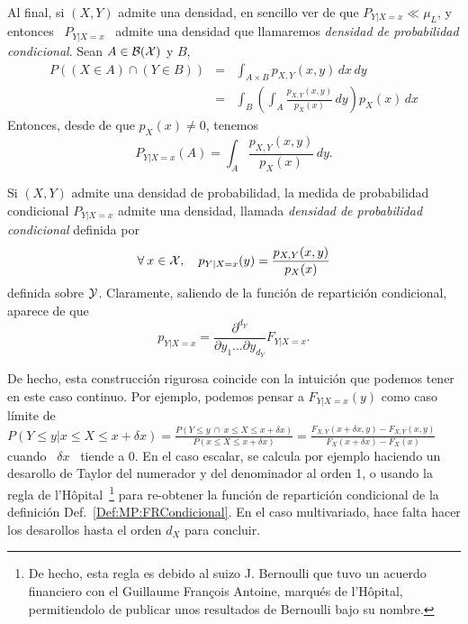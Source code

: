 Al final, si $(X,Y)$ admite una  densidad, en sencillo ver de que $P_{Y|X=x} \ll
\mu_L$,  y entonces  \ $P_{Y|X=x}$  \ admite  una densidad  que  llamaremos {\it
  densidad de probabilidad condicional}. Sean $A \in \mathcal{B}(\mathcal{X})$ y $B$,
%
\begin{eqnarray*}
P\left( (X \in A) \cap (Y \in B) \right) & = & \int_{A \times B} p_{X,Y}(x,y) \, dx \, dy\\[2mm]
%
& = & \int_B \left( \int_A \frac{p_{X,Y}(x,y)}{p_X(x)} \, dy \right) p_X(x) \, dx
\end{eqnarray*}
%
Entonces, desde de que $p_X(x) \ne 0$, tenemos
%
\[
P_{Y|X=x}(A) = \int_A \frac{p_{X,Y}(x,y)}{p_X(x)} \, dy.
\]
%
\begin{teorema}
\label{Def:MP:DensidadCondicional}
%
  Si  $(X,Y)$ admite  una densidad  de probabilidad,  la medida  de probabilidad
  condicional  $P_{Y|X=x}$  admite  una   densidad,  llamada  {\it  densidad  de
    probabilidad condicional} definida por
  \[
  \forall \: x \in \mathcal{X}, \quad p_{Y|X=x}(y) = \frac{p_{X,Y}(x,y)}{p_X(x)}
  \]
  definida  sobre $\mathcal{Y}$. Claramente,  saliendo de  la funci\'on  de repartici\'on
  condicional, aparece de que
  \[
  p_{Y|X=x} = \frac{\partial^{d_Y}}{\partial y_1 \ldots \partial y_{d_Y}} F_{Y|X=x}.
  \]
\end{teorema}

De hecho, esta  construcci\'on rigurosa coincide con la  intuici\'on que podemos
tener en este  caso continuo. Por ejemplo, podemos  pensar a $F_{Y|X=x}(y)$ como
caso l\'imite de $P(\left. Y \le y \right|  x \le X \le x+\delta x) = \frac{P( Y
  \le  y \:  \cap \:  x \le  X \le  x+\delta x)}{P(x  \le X  \le x+\delta  x)} =
\frac{F_{X,Y}(x+\delta  x ,  y) -  F_{X,Y}(x  , y)}{F_X(x+\delta  x) -  F_X(x)}$
cuando \ $\delta  x$ \ tiende a 0.   En el caso escalar, se  calcula por ejemplo
haciendo un  desarollo de Taylor del numerador  y del denominador al  orden 1, o
usando la regla de l'H\^opital~\footnote{De hecho, esta regla es debido al suizo
  J.  Bernoulli  que tuvo  un acuerdo financiero  con el  Guillaume Fran\c{c}ois
  Antoine, marqu\'es  de l'H\^opital, permitiendolo de  publicar unos resultados
  de Bernoulli bajo  su nombre.}  para re-obtener la  funci\'on de repartici\'on
condicional  de  la  definici\'on  Def.~\ref{Def:MP:FRCondicional}. En  el  caso
multivariado,  hace  falta  hacer  los  desarollos hasta  el  orden  $d_X$  para
concluir.

